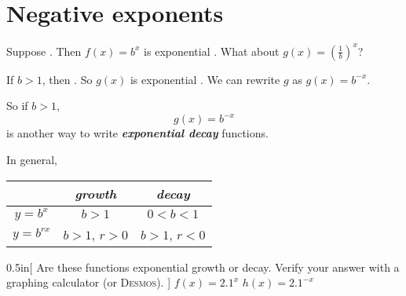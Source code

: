 \section{Negative exponents}

Suppose .
Then $f(x) = b^x$ is exponential .
What about $g(x) = \left(\frac{1}{b}\right)^x$?

If $b>1$, 
then .
So $g(x)$ is exponential .
We can rewrite $g$ as $g(x) = b^{-x}$. 

\begin{myCenteredBox}[width=4in,]
    So
    if $b>1$,
    \[   g(x) = b^{-x}   \]
    is another way to write 
    {\bfseries\itshape exponential decay} functions.
\end{myCenteredBox}



\begin{myCenteredBox}[width=4in,]
    In general,\par
    \centering
    \begin{tabular}{c||c|c}
        {} & {\bfseries\itshape growth} & {\bfseries\itshape  decay} \\
        \hline
        $y=b^x$ &  $b>1$ & $0<b<1$ \\
        $y=b^{rx}$
            & 
            $b>1$, \quad $r>0$
            &
            $b>1$, \quad $r<0$
            \\
    \end{tabular}
\end{myCenteredBox}




\begin{my2Problems}{0.5in}[%
    Are these functions exponential growth or decay.
    Verify your answer with a graphing calculator (or {\scshape Desmos}).
]
{
    $f(x) = 2.1^x$
}
{
    $h(x) = 2.1^{-x}$
}
\end{my2Problems}
